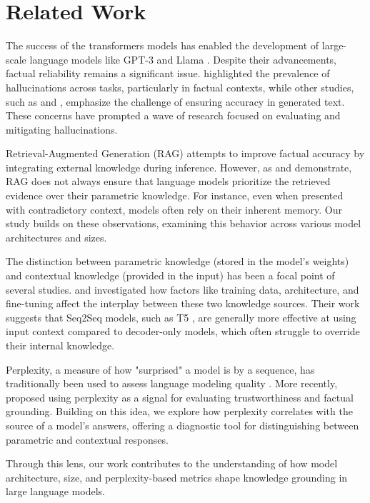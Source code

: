 \section{Related Work}

The success of the transformers models \citep{attention_is_all_you_need} has enabled the development of large-scale language models like GPT-3 \citep{gpt3} and Llama \citep{llama}.
Despite their advancements, factual reliability remains a significant issue.
\citeauthor{how_can_we_know} highlighted the prevalence of hallucinations across tasks, particularly in factual contexts, while other studies, such as \citep{can_rag_models_reason} and \citep{gpt2}, emphasize the challenge of ensuring accuracy in generated text.
These concerns have prompted a wave of research focused on evaluating and mitigating hallucinations.

Retrieval-Augmented Generation (RAG) \citep{rag,atlas_foundational,retro} attempts to improve factual accuracy by integrating external knowledge during inference.
However, as \citeauthor{ragged} and \citeauthor{factual_recall} demonstrate, RAG does not always ensure that language models prioritize the retrieved evidence over their parametric knowledge.
For instance, even when presented with contradictory context, models often rely on their inherent memory.
Our study builds on these observations, examining this behavior across various model architectures and sizes.

The distinction between parametric knowledge (stored in the model's weights) and contextual knowledge (provided in the input) has been a focal point of several studies.
\citeauthor{factual_recall} and \citeauthor{knowledge_grounding_retrieval_augmented} investigated how factors like training data, architecture, and fine-tuning affect the interplay between these two knowledge sources.
Their work suggests that Seq2Seq models, such as T5 \citep{t5,flant5}, are generally more effective at using input context compared to decoder-only models, which often struggle to override their internal knowledge.

Perplexity, a measure of how "surprised" a model is by a sequence, has traditionally been used to assess language modeling quality \citep{how_can_we_know}.
More recently, \citeauthor{learning_the_difference} proposed using perplexity as a signal for evaluating trustworthiness and factual grounding.
Building on this idea, we explore how perplexity correlates with the source of a model's answers, offering a diagnostic tool for distinguishing between parametric and contextual responses.

Through this lens, our work contributes to the understanding of how model architecture, size, and perplexity-based metrics shape knowledge grounding in large language models.
